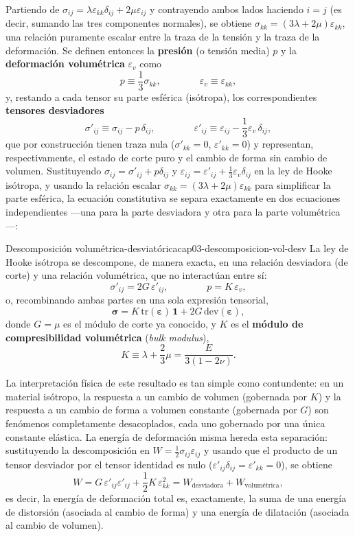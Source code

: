 Partiendo de $\sigma_{ij}=\lambda\varepsilon_{kk}\delta_{ij}+2\mu\varepsilon_{ij}$ y contrayendo ambos lados haciendo $i=j$ (es decir, sumando las tres componentes normales), se obtiene $\sigma_{kk}=(3\lambda+2\mu)\varepsilon_{kk}$, una relación puramente escalar entre la traza de la tensión y la traza de la deformación. Se definen entonces la \textbf{presión} (o tensión media) $p$ y la \textbf{deformación volumétrica} $\varepsilon_v$ como
\[
p \equiv \frac{1}{3}\sigma_{kk}, \qquad\qquad \varepsilon_v \equiv \varepsilon_{kk},
\]
y, restando a cada tensor su parte esférica (isótropa), los correspondientes \textbf{tensores desviadores}
\[
\sigma'_{ij} \equiv \sigma_{ij} - p\,\delta_{ij}, \qquad\qquad \varepsilon'_{ij} \equiv \varepsilon_{ij} - \frac{1}{3}\varepsilon_v\,\delta_{ij},
\]
que por construcción tienen traza nula ($\sigma'_{kk}=0$, $\varepsilon'_{kk}=0$) y representan, respectivamente, el estado de corte puro y el cambio de forma sin cambio de volumen. Sustituyendo $\sigma_{ij}=\sigma'_{ij}+p\delta_{ij}$ y $\varepsilon_{ij}=\varepsilon'_{ij}+\tfrac{1}{3}\varepsilon_v\delta_{ij}$ en la ley de Hooke isótropa, y usando la relación escalar $\sigma_{kk}=(3\lambda+2\mu)\varepsilon_{kk}$ para simplificar la parte esférica, la ecuación constitutiva se separa exactamente en dos ecuaciones independientes —una para la parte desviadora y otra para la parte volumétrica—:

\begin{ecnimportante}{Descomposición volumétrica-desviatórica}{cap03-descomposicion-vol-desv}
La ley de Hooke isótropa se descompone, de manera exacta, en una relación desviadora (de corte) y una relación volumétrica, que no interactúan entre sí:
\[
\sigma'_{ij} = 2G\,\varepsilon'_{ij}, \qquad\qquad p = K\,\varepsilon_v,
\]
o, recombinando ambas partes en una sola expresión tensorial,
\[
\bm\sigma = K\,\mathrm{tr}(\bm\varepsilon)\,\bm 1 + 2G\,\mathrm{dev}(\bm\varepsilon),
\]
donde $G=\mu$ es el módulo de corte ya conocido, y $K$ es el \textbf{módulo de compresibilidad volumétrica} (\emph{bulk modulus}),
\[
K \equiv \lambda + \frac{2}{3}\mu = \frac{E}{3(1-2\nu)}.
\]
\end{ecnimportante}

La interpretación física de este resultado es tan simple como contundente: en un material isótropo, la respuesta a un cambio de volumen (gobernada por $K$) y la respuesta a un cambio de forma a volumen constante (gobernada por $G$) son fenómenos completamente desacoplados, cada uno gobernado por una única constante elástica. La energía de deformación misma hereda esta separación: sustituyendo la descomposición en $W=\tfrac{1}{2}\sigma_{ij}\varepsilon_{ij}$ y usando que el producto de un tensor desviador por el tensor identidad es nulo ($\varepsilon'_{ij}\delta_{ij}=\varepsilon'_{kk}=0$), se obtiene
\[
W = G\,\varepsilon'_{ij}\varepsilon'_{ij} + \frac{1}{2}K\,\varepsilon_{kk}^2 = W_{\text{desviadora}} + W_{\text{volumétrica}},
\]
es decir, la energía de deformación total es, exactamente, la suma de una energía de distorsión (asociada al cambio de forma) y una energía de dilatación (asociada al cambio de volumen).

